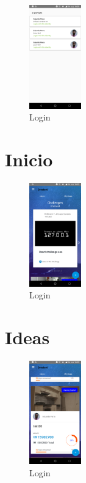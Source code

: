 \begin{figure}[!h]
	\begin{center}
		\includegraphics[width=0.2\textwidth]{./img/anexo1/seleccion_empresa.png}
		\caption{Login}
		\label{fig:seleccion_empresa}
	\end{center}
\end{figure}

\section{Inicio}

\begin{figure}[!h]
	\begin{center}
		\includegraphics[width=0.2\textwidth]{./img/anexo1/inicio.png}
		\caption{Login}
		\label{fig:inicio}
	\end{center}
\end{figure}

\section{Ideas}

\begin{figure}[!h]
	\begin{center}
		\includegraphics[width=0.2\textwidth]{./img/anexo1/inicio_mis_ideas.png}
		\caption{Login}
		\label{fig:inicio_mis_ideas}
	\end{center}
\end{figure}

